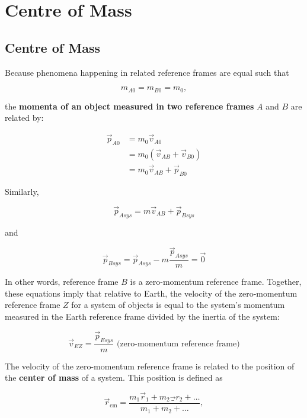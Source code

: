 \section{Centre of Mass}

    \subsection{Centre of Mass}

        Because phenomena happening in related reference frames are equal such that

        \[
            m_{A0} = m_{B0} = m_{0},
        \]

        the \textbf{momenta of an object measured in two reference frames} $A$ and $B$ are related by:

        \begin{align*}
            \overrightarrow{p}_{A0} &= m_0 \overrightarrow{v}_{A0} \\
                                    &= m_0 (\overrightarrow{v}_{AB} + \overrightarrow{v}_{B0}) \\
                                    &= m_0 \overrightarrow{v}_{AB} + \overrightarrow{p}_{B0}
        \end{align*}

        Similarly,

        \[
            \overrightarrow{p}_{Asys} = m\overrightarrow{v}_{AB} + \overrightarrow{p}_{Bsys}
        \]

        and

        \[
            \vec{p}_{Bsys} = \overrightarrow{p}_{Asys} - m\frac{\overrightarrow{p}_{Asys}}{m}=\overrightarrow{0}
        \]

        In other words, reference frame $B$ is a zero-momentum reference frame. Together, these equations imply that relative to Earth, the velocity of the zero-momentum reference frame $Z$ for a system of objects is
        equal to the system's momentum measured in the Earth reference frame divided by the inertia of the system:

        \[
            \vec{v}_{EZ} = \frac{\vec{p}_{Esys}}{m} \text{ (zero-momentum reference frame)}
        \]

        The velocity of the zero-momentum reference frame is related to the position of the \textbf{center of mass} of a system. This position is defined as

        \[
            \vec{r}_{\text{cm}} = \frac{m_1\vec{r}_1 + m_2 \vec_{r}_2 + \dots}{m_1 + m_2 + \dots},
        \]

